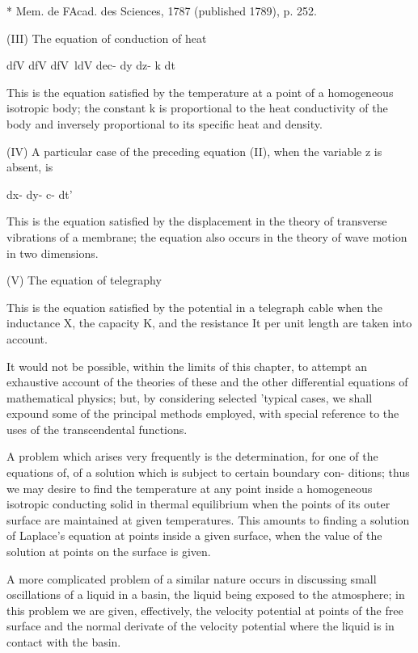 * Mem. de FAcad. des Sciences, 1787 (published 1789), p. 252.

%
%

(III) The equation of conduction of heat

dfV dfV dfV\ ldV dec- dy dz- k dt

This is the equation satisfied by the temperature at a point of a
homogeneous isotropic body; the constant k is proportional to the
heat conductivity of the body and inversely proportional to its
specific heat and density.

(IV) A particular case of the preceding equation (II), when the
variable z is absent, is

dx- dy- c- dt'

This is the equation satisfied by the displacement in the theory of
transverse vibrations of a membrane; the equation also occurs in the
theory of wave motion in two dimensions.

(V) The equation of telegraphy

This is the equation satisfied by the potential in a telegraph cable
when the inductance X, the capacity K, and the resistance It per unit
length are taken into account.

It would not be possible, within the limits of this chapter, to
attempt an exhaustive account of the theories of these and the other
differential equations of mathematical physics; but, by considering
selected 'typical cases, we shall expound some of the principal
methods employed, with special reference to the uses of the
transcendental functions.


A problem which arises very frequently is the determination, for one
of the equations of, of a solution which is subject to certain
boundary con- ditions; thus we may desire to find the temperature at
any point inside a homogeneous isotropic conducting solid in thermal
equilibrium when the points of its outer surface are maintained at
given temperatures. This amounts to finding a solution of Laplace's
equation at points inside a given surface, when the value of the
solution at points on the surface is given.

A more complicated problem of a similar nature occurs in discussing
small oscillations of a liquid in a basin, the liquid being exposed to
the atmosphere; in this problem we are given, effectively, the
velocity potential at points of the free surface and the normal
derivate of the velocity potential where the liquid is in contact with
the basin.

